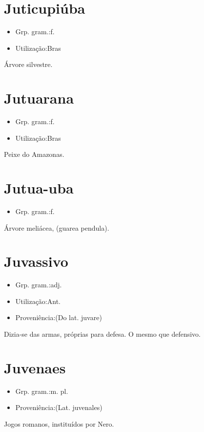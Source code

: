 \documentclass{article}
\begin{document}
\section{Juticupiúba}
\begin{itemize}
\item {Grp. gram.:f.}
\end{itemize}
\begin{itemize}
\item {Utilização:Bras}
\end{itemize}
Árvore silvestre.
\section{Jutuarana}
\begin{itemize}
\item {Grp. gram.:f.}
\end{itemize}
\begin{itemize}
\item {Utilização:Bras}
\end{itemize}
Peixe do Amazonas.
\section{Jutua-uba}
\begin{itemize}
\item {Grp. gram.:f.}
\end{itemize}
Árvore meliácea, (\textunderscore guarea pendula\textunderscore ).
\section{Juvassivo}
\begin{itemize}
\item {Grp. gram.:adj.}
\end{itemize}
\begin{itemize}
\item {Utilização:Ant.}
\end{itemize}
\begin{itemize}
\item {Proveniência:(Do lat. \textunderscore juvare\textunderscore )}
\end{itemize}
Dizia-se das armas, próprias para defesa.
O mesmo que \textunderscore defensivo\textunderscore .
\section{Juvenaes}
\begin{itemize}
\item {Grp. gram.:m. pl.}
\end{itemize}
\begin{itemize}
\item {Proveniência:(Lat. \textunderscore juvenales\textunderscore )}
\end{itemize}
Jogos romanos, instituídos por Nero.
\end{document}
